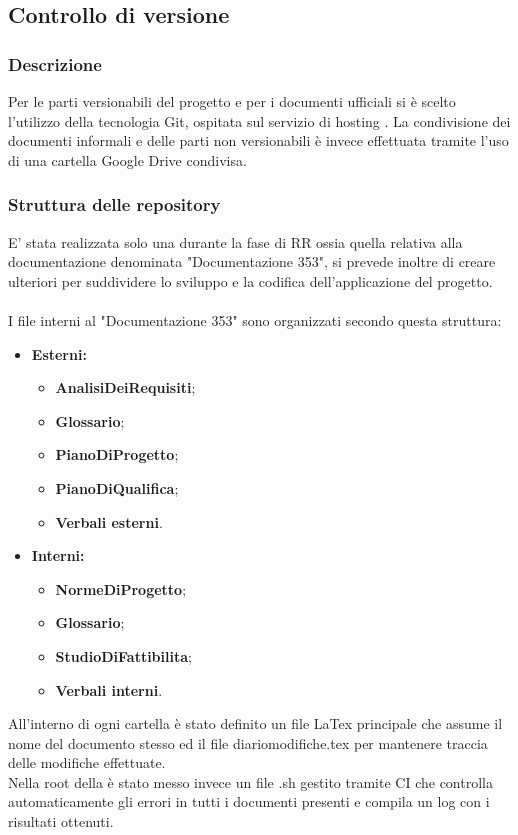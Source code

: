 \documentclass[NormeDiProgetto.tex]{subfiles}
\begin{document}
	\subsection{Controllo di versione}
	
	\subsubsection{Descrizione}
	Per le parti versionabili del progetto e per i documenti ufficiali si è scelto l'utilizzo della tecnologia Git, ospitata sul servizio di hosting .
	La condivisione dei documenti informali e delle parti non versionabili è invece effettuata tramite l'uso di una cartella Google Drive condivisa.
	
	\subsubsection{Struttura delle repository}
	E' stata realizzata solo una  durante la fase di RR ossia quella relativa alla documentazione denominata "Documentazione 353", si prevede inoltre di creare ulteriori  per suddividere lo sviluppo e la codifica dell'applicazione del progetto. \\\\
	I file interni al  "Documentazione 353" sono organizzati secondo questa struttura:
	\begin{itemize}
		\item \textbf{Esterni:}
				\begin{itemize}
				\item \textbf{AnalisiDeiRequisiti};
				\item \textbf{Glossario};
				\item \textbf{PianoDiProgetto};
				\item \textbf{PianoDiQualifica};
				\item \textbf{Verbali esterni}.
			\end{itemize}
		\item \textbf{Interni:}
				\begin{itemize}
					\item \textbf{NormeDiProgetto};
					\item \textbf{Glossario};
					\item \textbf{StudioDiFattibilita};
					\item \textbf{Verbali interni}.
				\end{itemize}		
	\end{itemize}	
	All'interno di ogni cartella è stato definito un file LaTex principale che assume il nome del documento stesso ed il file diariomodifiche.tex per mantenere traccia delle modifiche effettuate.\\
	Nella root della  è stato messo invece un file .sh gestito tramite  CI che controlla automaticamente gli errori in tutti i documenti presenti e compila un log con i risultati ottenuti.
	
\end{document}
